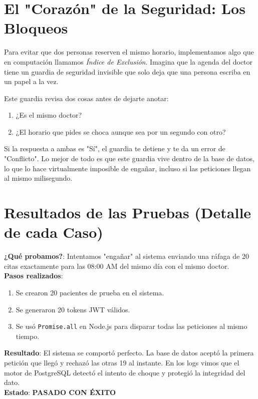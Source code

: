 \documentclass[a4paper,11pt]{article}
\begin{document}
  \section{El "Corazón" de la Seguridad: Los Bloqueos}
  Para evitar que dos personas reserven el mismo horario, implementamos algo que en computación llamamos \textit{Índice de Exclusión}. Imagina que la agenda del doctor tiene un guardia de seguridad invisible que solo deja que una persona escriba en un papel a la vez.

  Este guardia revisa dos cosas antes de dejarte anotar:
  \begin{enumerate}
      \item ¿Es el mismo doctor?
      \item ¿El horario que pides se choca aunque sea por un segundo con otro?
  \end{enumerate}

  Si la respuesta a ambas es "Sí", el guardia te detiene y te da un error de "Conflicto". Lo mejor de todo es que este guardia vive dentro de la base de datos, lo que lo hace virtualmente imposible de engañar, incluso si las peticiones llegan al mismo milisegundo.

  \newpage
  \section{Resultados de las Pruebas (Detalle de cada Caso)}

  \begin{tcolorbox}[colback=blue!5,colframe=blue!70!black,title=\textbf{PRUEBA ST-01: Concurrencia Pura (Ataque de Citas)}]
  \textbf{¿Qué probamos?}: Intentamos "engañar" al sistema enviando una ráfaga de 20 citas exactamente para las 08:00 AM del mismo día con el mismo doctor. \\
  \textbf{Pasos realizados}:
  \begin{enumerate}
      \item Se crearon 20 pacientes de prueba en el sistema.
      \item Se generaron 20 tokens JWT válidos.
      \item Se usó \texttt{Promise.all} en Node.js para disparar todas las peticiones al mismo tiempo.
  \end{enumerate}
  \textbf{Resultado}: El sistema se comportó perfecto. La base de datos aceptó la primera petición que llegó y rechazó las otras 19 al instante. En los logs vimos que el motor de PostgreSQL detectó el intento de choque y protegió la integridad del dato. \\
  \textbf{Estado}: \color{blue}\textbf{PASADO CON ÉXITO}
  \end{tcolorbox}
\end{document}
